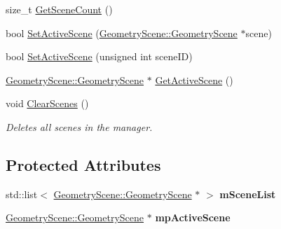 \begin{DoxyCompactItemize}
size\+\_\+t \mbox{\hyperlink{class_geometry_engine_1_1_scene_manager_ae968659ac54b71f6089e2251c99cfd04}{Get\+Scene\+Count}} ()
\item 
bool \mbox{\hyperlink{class_geometry_engine_1_1_scene_manager_a0d493622807bb55d8e33a313ca61a3db}{Set\+Active\+Scene}} (\mbox{\hyperlink{class_geometry_engine_1_1_geometry_scene_1_1_geometry_scene}{Geometry\+Scene\+::\+Geometry\+Scene}} $\ast$scene)
\item 
bool \mbox{\hyperlink{class_geometry_engine_1_1_scene_manager_a2a188fd362d750afeca3aa79102fc9de}{Set\+Active\+Scene}} (unsigned int scene\+ID)
\item 
\mbox{\hyperlink{class_geometry_engine_1_1_geometry_scene_1_1_geometry_scene}{Geometry\+Scene\+::\+Geometry\+Scene}} $\ast$ \mbox{\hyperlink{class_geometry_engine_1_1_scene_manager_a8d9620773e7ee65a82aa13bb4a1a1fdf}{Get\+Active\+Scene}} ()
\item 
\mbox{\label{class_geometry_engine_1_1_scene_manager_ae7eaea410cbd27d602cefaf388d76d2d}} 
void \mbox{\hyperlink{class_geometry_engine_1_1_scene_manager_ae7eaea410cbd27d602cefaf388d76d2d}{Clear\+Scenes}} ()
\begin{DoxyCompactList}\small\item\em Deletes all scenes in the manager. \end{DoxyCompactList}\end{DoxyCompactItemize}
\subsection*{Protected Attributes}
\begin{DoxyCompactItemize}
\item 
\mbox{\label{class_geometry_engine_1_1_scene_manager_a8b458621cdce072650b3e731710d52e7}} 
std\+::list$<$ \mbox{\hyperlink{class_geometry_engine_1_1_geometry_scene_1_1_geometry_scene}{Geometry\+Scene\+::\+Geometry\+Scene}} $\ast$ $>$ {\bfseries m\+Scene\+List}
\item 
\mbox{\label{class_geometry_engine_1_1_scene_manager_ac33c3f2458f3e4e120a370916102a545}} 
\mbox{\hyperlink{class_geometry_engine_1_1_geometry_scene_1_1_geometry_scene}{Geometry\+Scene\+::\+Geometry\+Scene}} $\ast$ {\bfseries mp\+Active\+Scene}
\end{DoxyCompactItemize}


